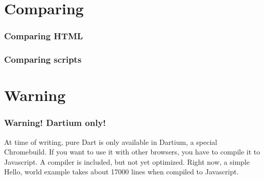 \documentclass[]{beamer}
\begin{document}
\section{Comparing}
\begin{frame}
\frametitle{Comparing HTML}
\begin{minipage}[t]{.45\textwidth}

\end{minipage}
\begin{minipage}[t]{.45\textwidth}

\end{minipage}
\end{frame}
\begin{frame}
\frametitle{Comparing scripts}
\begin{minipage}[t]{.45\textwidth}
	
\end{minipage}
\begin{minipage}[t]{.45\textwidth}
	
\end{minipage}
\end{frame}
\section{Warning}
\begin{frame}
\frametitle{\color{red}Warning! Dartium only!}
At time of writing, pure Dart is only available in Dartium, a special Chromebuild. If you want to use it with other browsers, you have to compile it to Javascript. A compiler is included, but not yet optimized. Right now, a simple Hello, world example takes about 17000 lines when compiled to Javascript.
\end{frame}
\end{document}

